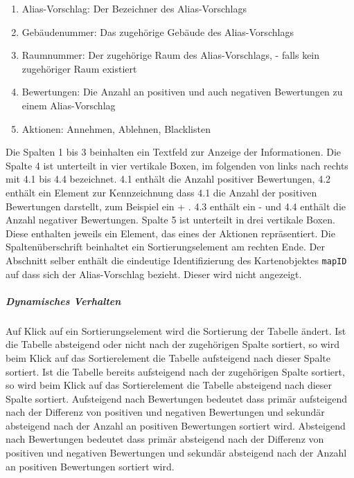 \begin{enumerate}
    \item Alias-Vorschlag: Der Bezeichner des Alias-Vorschlags
    \item Gebäudenummer: Das zugehörige Gebäude des Alias-Vorschlags
    \item Raumnummer: Der zugehörige Raum des Alias-Vorschlags, \dq - \dq{} falls kein zugehöriger Raum existiert
    \item Bewertungen: Die Anzahl an positiven und auch negativen Bewertungen zu einem Alias-Vorschlag
    \item Aktionen: Annehmen, Ablehnen, Blacklisten
\end{enumerate}

Die Spalten 1 bis 3 beinhalten ein Textfeld zur Anzeige der Informationen.
Die Spalte 4 ist unterteilt in vier vertikale Boxen, im folgenden von links nach rechts mit 4.1 bis 4.4 bezeichnet.
4.1 enthält die Anzahl positiver Bewertungen, 4.2 enthält ein Element zur Kennzeichnung dass 4.1 die Anzahl der positiven Bewertungen darstellt, zum Beispiel ein \dq + \dq.
4.3 enthält ein \dq - \dq{} und 4.4 enthält die Anzahl negativer Bewertungen.
Spalte 5 ist unterteilt in drei vertikale Boxen. Diese enthalten jeweils ein Element, das eines der Aktionen repräsentiert. 
Die Spaltenüberschrift beinhaltet ein Sortierungselement am rechten Ende.
Der Abschnitt selber enthält die eindeutige Identifizierung des Kartenobjektes \verb#mapID# auf dass sich der Alias-Vorschlag bezieht. Dieser wird nicht angezeigt.

\subparagraph*{Dynamisches Verhalten}
Auf Klick auf ein Sortierungselement wird die Sortierung der Tabelle ändert.
Ist die Tabelle absteigend oder nicht nach der zugehörigen Spalte sortiert, so wird beim Klick auf das Sortierelement die Tabelle aufsteigend nach dieser Spalte sortiert.
Ist die Tabelle bereits aufsteigend nach der zugehörigen Spalte sortiert, so wird beim Klick auf das Sortierelement die Tabelle absteigend nach dieser Spalte sortiert.
Aufsteigend nach Bewertungen bedeutet dass primär aufsteigend nach der Differenz von positiven und negativen Bewertungen und sekundär absteigend nach der Anzahl an positiven Bewertungen sortiert wird.
Absteigend nach Bewertungen bedeutet dass primär absteigend nach der Differenz von positiven und negativen Bewertungen und sekundär absteigend nach der Anzahl an positiven Bewertungen sortiert wird.

